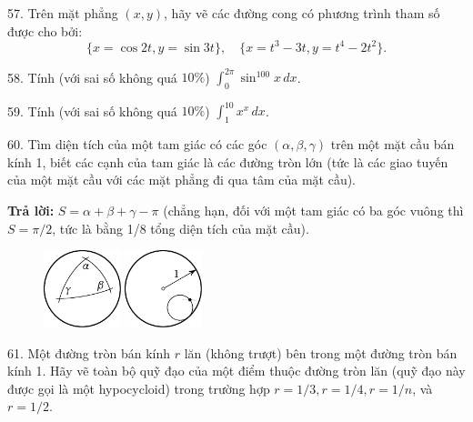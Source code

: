 \begin{problem}{57.}
	Trên mặt phẳng $(x,y)$, hãy vẽ các đường cong có phương trình tham số được cho bởi:
	\begin{equation*}
		\{x=\cos 2t, y=\sin 3t\},\quad 
		\{x=t^3-3t, y=t^4-2t^2\}.
	\end{equation*}
	\vspace{-2\baselineskip}%
\end{problem}

\begin{problem}{58.}
	Tính (với sai số không quá $10 \%$) $\int_0^{2\pi}\sin^{100}x\,dx$.
\end{problem}

\begin{problem}{59.}
	Tính (với sai số không quá $10 \%$) $\int_1^{10} x^x\,dx$.
\end{problem}

\begin{problem}{60.}
	Tìm diện tích của một tam giác có các góc $(\alpha, \beta, \gamma)$ trên một mặt cầu bán kính 1, biết các cạnh của tam giác là các đường tròn lớn (tức là các giao tuyến của một mặt cầu với các mặt phẳng đi qua tâm của mặt cầu).

	\textbf{Trả lời:} $S=\alpha+\beta+\gamma -\pi$ (chẳng hạn, đối với một tam giác có ba góc vuông thì $S=\pi/2$, tức là bằng 1/8 tổng diện tích của mặt cầu).
	\begin{figure}
		\includegraphics[width=0.2\textwidth]{taskbook-44} \qquad \includegraphics[width=0.2\textwidth]{taskbook-45} 
	\end{figure}
\end{problem}

\begin{problem}{61.}
	Một đường tròn bán kính $r$ lăn (không trượt) bên trong một đường tròn bán kính 1.
	Hãy vẽ toàn bộ quỹ đạo của một điểm thuộc đường tròn lăn (quỹ đạo này được gọi là một hypocycloid) trong trường hợp $r=1/3, r=1/4, r=1/n$, và $r=1/2$. 
\end{problem}

